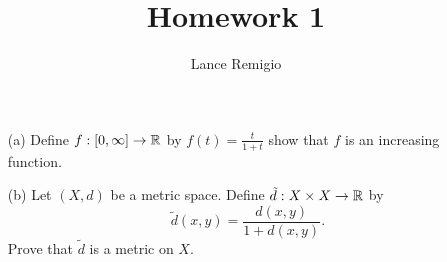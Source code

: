 \documentclass[a4paper]{article}
\title{Homework 1}
\author{Lance Remigio}
\begin{document}
\maketitle

\begin{problem}
   \begin{enumerate}
       \item[(a)] Define \( f: [0,\infty  ] \to \mathbb{R}  \) by \( f(t) = \frac{ t  }{  1 + t  }  \) show that \( f  \) is an increasing function.
       \item[(b)] Let \( (X,d) \) be a metric space. Define \( \tilde{d}  : X \times X \to \mathbb{R}  \) by
           \[  \tilde{d}(x,y) = \frac{ d(x,y) }{ 1 + d(x,y) }. \]
           Prove that \( \tilde{d} \) is a metric on \( X  \).
   \end{enumerate} 
\end{problem}
\end{document}
